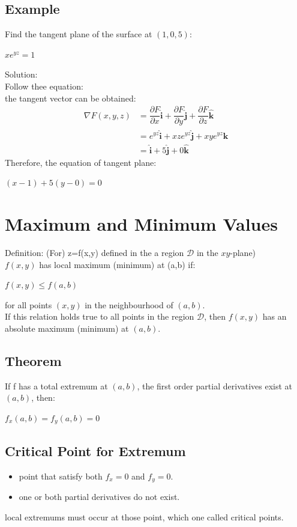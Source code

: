 \documentclass[UTF8,a4paper, 10pt, openany]{book}
\begin{document}
\subsection{Example}
Find the tangent plane of the surface at $(1,0,5)$:
\begin{center}
$xe^{yz}=1$
\end{center}
Solution:\\
Follow thee equation:\\
the tangent vector can be obtained:
\begin{align*}
\nabla F(x,y,z)&=\dfrac{\partial F}{\partial x}\mathbf{\hat{i}}+\dfrac{\partial F}{\partial y}\mathbf{\hat{j}}+\dfrac{\partial F}{\partial z}\mathbf{\hat{k}}\\
&= e^{yz}\mathbf{\hat{i}}+xze^{yz}\mathbf{\hat{j}}+xye^{yz}\mathbf{\hat{k}}\\
&= \mathbf{\hat{i}}+5\mathbf{\hat{j}}+0\mathbf{\hat{k}}
\end{align*}
Therefore, the equation of tangent plane:
\begin{center}
$(x-1)+5(y-0)=0$
\end{center}
\section{Maximum and Minimum Values}
Definition: (For) z=f(x,y) defined in the a region $\mathcal{D}$ in the $xy$-plane)\\
$f(x,y)$ has local maximum (minimum) at (a,b) if:
\begin{center}
$f(x,y)\leq f(a,b)$
\end{center}
for all points $(x,y)$ in the neighbourhood of $(a,b)$.\\
If this relation holds true to all points in the region $\mathcal{D}$, then $f(x,y)$ has an absolute maximum (minimum) at $(a,b)$.
\subsection{Theorem}
If f has a total extremum at $(a,b)$, the first order partial derivatives exist at $(a,b)$, then:
\begin{center}
$f_x(a,b)=f_y(a,b)=0$
\end{center}
\subsection{Critical Point for Extremum}
\begin{itemize}
\item point that satisfy both $f_x=0$ and $f_y=0$.
\item one or both partial derivatives do not exist.
\end{itemize}
local extremums must occur at those point, which one called critical points.
\end{document}
